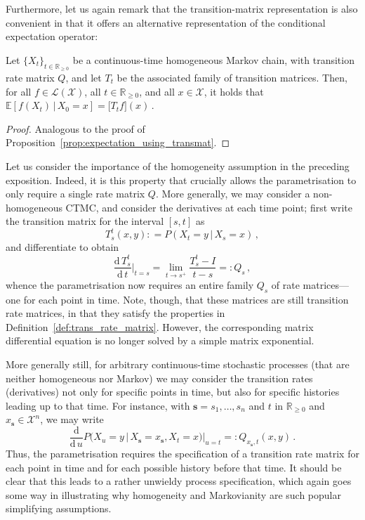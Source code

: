 \documentclass[graybox]{svmult}
\newcommand{\reals}{\mathbb{R}}
\newcommand{\realsnonneg}{\reals_{\geq 0}}
\newcommand{\states}{\mathcal{X}}
\newcommand{\gambles}{\mathcal{L}}
\newcommand{\gamblesX}{\gambles(\states)}
\newcommand{\coloneqq}{:\!=}
\begin{document}
Furthermore, let us again remark that the transition-matrix representation is also convenient in that it offers an alternative representation of the conditional expectation operator:
\begin{proposition}\label{prop:expectation_using_transmat_also_ctmc}
Let $\{X_t\}_{t\in\realsnonneg}$ be a continuous-time homogeneous Markov chain, with transition rate matrix $Q$, and let $T_t$ be the associated family of transition matrices. Then, for all $f\in\gamblesX$, all $t\in\realsnonneg$, and all $x\in\states$, it holds that $\mathbb{E}[f(X_t)\,\vert\,X_0=x]=\bigl[T_tf\bigr](x)$\,.
\end{proposition}
\begin{proof}
Analogous to the proof of Proposition~\ref{prop:expectation_using_transmat}.
\end{proof}

Let us consider the importance of the homogeneity assumption in the preceding exposition. Indeed, it is this property that crucially allows the parametrisation to only require a single rate matrix $Q$. More generally, we may consider a non-homogeneous CTMC, and consider the derivatives at each time point; first write the transition matrix for the interval $[s,t]$ as
\begin{equation*}
T_s^t(x,y) \coloneqq P(X_t=y\,\vert\,X_s=x)\,,
\end{equation*}
and differentiate to obtain
\begin{equation*}
\frac{\mathrm{d}\,T_s^t}{\mathrm{d}\,t}\bigg\vert_{t=s} = \lim_{t\to s^+}\frac{T_s^t-I}{t-s} =: Q_s\,,
\end{equation*}
whence the parametrisation now requires an entire family $Q_s$ of rate matrices---one for each point in time. Note, though, that these matrices are still transition rate matrices, in that they satisfy the properties in Definition~\ref{def:trans_rate_matrix}. However, the corresponding matrix differential equation is no longer solved by a simple matrix exponential. 

More generally still, for arbitrary continuous-time stochastic processes (that are neither homogeneous nor Markov) we may consider the transition rates (derivatives) not only for specific points in time, but also for specific histories leading up to that time. For instance, with $\mathbf{s}=s_1,\ldots,s_n$ and $t$ in $\realsnonneg$ and $x_\mathbf{s}\in\states^n$, we may write
\begin{equation}\label{eq:general_cont_time_deriv} \frac{\mathrm{d}}{\mathrm{d}\,u}P\bigl(X_u=y\,\vert\,X_\mathbf{s}=x_\mathbf{s},X_t=x\bigr)\bigg\vert_{u=t} =: Q_{x_\mathbf{s},t}(x,y)\,.
\end{equation}
Thus, the parametrisation requires the specification of a transition rate matrix for each point in time and for each possible history before that time. It should be clear that this leads to a rather unwieldy process specification, which again goes some way in illustrating why homogeneity and Markovianity are such popular simplifying assumptions.
\end{document}
